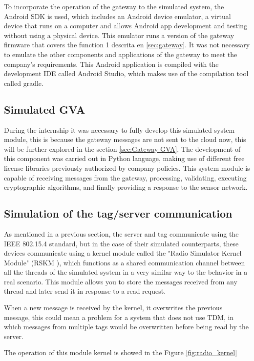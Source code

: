 \documentclass[journal]{IEEEtran}	%
\begin{document}
To incorporate the operation of the gateway to the simulated system, the Android SDK is used, which includes an Android device emulator, a virtual device that runs on a computer and allows Android app development and testing without using a physical device. This emulator runs a version of the gateway firmware that covers the function 1 descrita en \ref{sec:gateway}. It was not necessary to emulate the other components and applications of the gateway to meet the company's requirements. This Android application is compiled with the development IDE called Android Studio, which makes use of the compilation tool called gradle.
\subsection{Simulated GVA}

During the internship it was necessary to fully develop this simulated system module, this is because the gateway messages are not sent to the cloud now, this will be further explored in the section \ref{sec:Gateway-GVA}. The development of this component was carried out in Python language, making use of different free license libraries previously authorized by company policies. This system module is capable of receiving messages from the gateway, processing, validating, executing cryptographic algorithms, and finally providing a response to the sensor network.

\subsection{Simulation of the tag/server communication}

As mentioned in a previous section, the server and tag communicate using the IEEE 802.15.4 standard, but in the case of their simulated counterparts, these devices communicate using a kernel module called the "Radio Simulator Kernel Module" (RSKM ), which functions as a shared communication channel between all the threads of the simulated system in a very similar way to the behavior in a real scenario. This module allows you to store the messages received from any thread and later send it in response to a read request.

When a new message is received by the kernel, it overwrites the previous message, this could mean a problem for a system that does not use TDM, in which messages from multiple tags would be overwritten before being read by the server.

The operation of this module kernel is showed in the Figure \ref{fig:radio_kernel}
\end{document}
